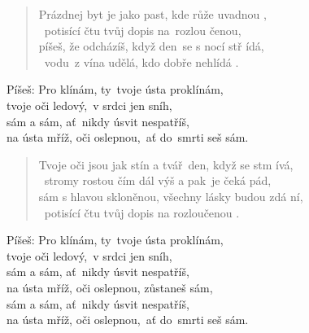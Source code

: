 \begin{song}{}
\begin{verse}
   Prázdnej byt je jako past, kde růže uvadnou ,  \\
   ~potisící čtu tvůj dopis na~rozlou čenou, \\
   píšeš, že odcházíš, když den~se s nocí stř ídá, \\
   ~vodu~z vína udělá, kdo dobře nehlídá .       
\end{verse}
\begin{refren}
   Píšeš: Pro klínám, ty~tvoje ústa proklínám, \\
          tvoje oči ledový,~v srdci jen sníh,  \\
          sám a sám, ať~nikdy úsvit nespatříš, \\
          na ústa mříž, oči oslepnou,~ať do~smrti seš sám.
\end{refren}
\begin{verse}
   Tvoje oči jsou jak stín a tvář~den, když se stm ívá, \\
   ~stromy rostou čím dál výš a pak~je čeká pád, \\
   sám s hlavou skloněnou, všechny lásky budou zdá ní, \\
   ~potisící čtu tvůj dopis na rozloučenou .      
\end{verse}
\begin{refren}
   Píšeš: Pro klínám, ty~tvoje ústa proklínám, \\
          tvoje oči ledový,~v srdci jen sníh, \\
          sám a sám, ať~nikdy úsvit nespatříš, \\
          na ústa mříž, oči oslepnou, zůstaneš sám, \\
          sám a sám, ať~nikdy úsvit nespatříš, \\
          na ústa mříž, oči oslepnou,~ať do~smrti seš sám.
\end{refren}
\end{song}
\pagebreak
